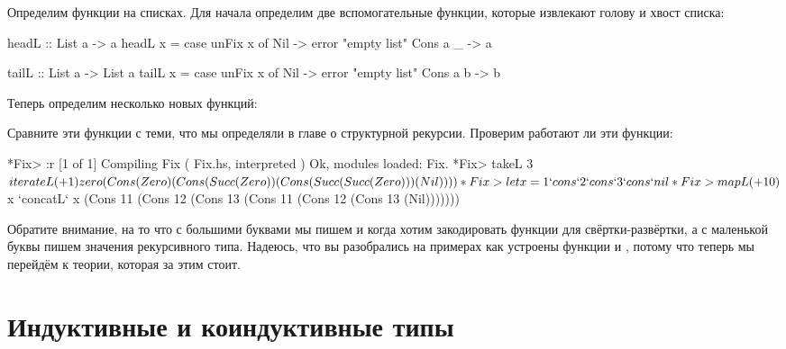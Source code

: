 
Определим функции на списках. Для начала определим две вспомогательные
функции, которые извлекают голову и хвост списка:


\begin{code}
headL :: List a -> a
headL x = case unFix x of
    Nil         -> error "empty list"
    Cons a _    -> a

tailL :: List a -> List a
tailL x = case unFix x of
    Nil         -> error "empty list"
    Cons a b    -> b
\end{code}

Теперь определим несколько новых функций:



Сравните эти функции с теми, что мы определяли в главе о структурной
рекурсии. Проверим работают ли эти функции:


\begin{code}
*Fix> :r
[1 of 1] Compiling Fix              ( Fix.hs, interpreted )
Ok, modules loaded: Fix.
*Fix> takeL 3 $ iterateL (+1) zero
(Cons (Zero) (Cons (Succ (Zero)) (Cons (Succ (Succ (Zero))) (Nil))))
*Fix> let x = 1 `cons` 2 `cons` 3 `cons` nil
*Fix> mapL (+10) $ x `concatL` x
(Cons 11 (Cons 12 (Cons 13 (Cons 11 (Cons 12 (Cons 13 (Nil)))))))
\end{code}

Обратите внимание, на то что с большими буквами мы пишем  и
 когда хотим закодировать функции для свёртки-развёртки, а с
маленькой буквы пишем значения рекурсивного типа. Надеюсь, что вы
разобрались на примерах как устроены функции  и ,
потому что теперь мы перейдём к теории, которая за этим стоит.

\section{Индуктивные и коиндуктивные типы}

